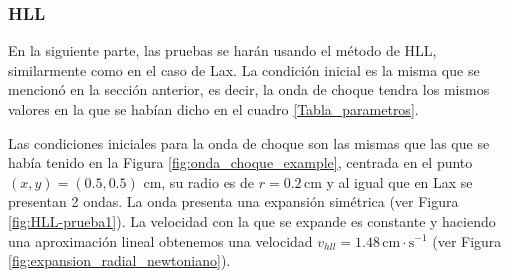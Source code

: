 \documentclass[12pt,a4paper]{book}
\begin{document}
\bigskip
%
%

\subsubsection{HLL}
En la siguiente parte, las pruebas se harán usando el método de HLL, similarmente como en el caso de Lax. La condición inicial es la misma que se mencionó en la sección anterior, es decir, la onda de choque tendra los mismos valores en la que se habían dicho en el cuadro \ref{Tabla_parametros}.	



Las condiciones iniciales para la onda de choque son las mismas que las que se había tenido en la Figura \ref{fig:onda_choque_example}, centrada en el punto $(x,y)=(0.5,0.5)$ cm, su radio es de $r = 0.2 \, \mathrm{cm}$ y al igual que en Lax se presentan 2 ondas. La onda presenta una expansión simétrica (ver Figura \ref{fig:HLL-prueba1}). La velocidad con la que se expande es constante y haciendo una aproximación lineal obtenemos una velocidad $v_{hll} = 1.48 \, \mathrm{cm} \cdot \mathrm{s}^{-1}$ (ver Figura \ref{fig:expansion_radial_newtoniano}).
\end{document}
